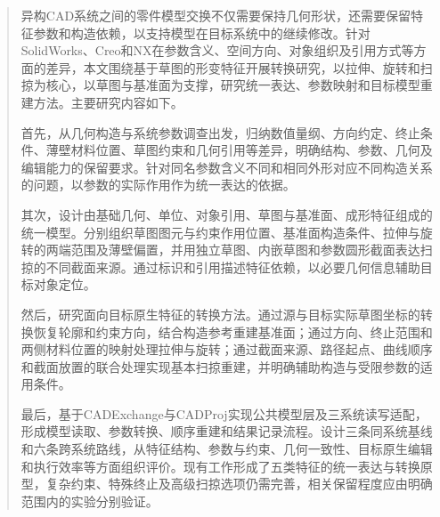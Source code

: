 \begin{abstract}
异构CAD系统之间的零件模型交换不仅需要保持几何形状，还需要保留特征参数和构造依赖，以支持模型在目标系统中的继续修改。针对SolidWorks、Creo和NX在参数含义、空间方向、对象组织及引用方式等方面的差异，本文围绕基于草图的形变特征开展转换研究，以拉伸、旋转和扫掠为核心，以草图与基准面为支撑，研究统一表达、参数映射和目标模型重建方法。主要研究内容如下。

首先，从几何构造与系统参数调查出发，归纳数值量纲、方向约定、终止条件、薄壁材料位置、草图约束和几何引用等差异，明确结构、参数、几何及编辑能力的保留要求。针对同名参数含义不同和相同外形对应不同构造关系的问题，以参数的实际作用作为统一表达的依据。

其次，设计由基础几何、单位、对象引用、草图与基准面、成形特征组成的统一模型。分别组织草图图元与约束作用位置、基准面构造条件、拉伸与旋转的两端范围及薄壁偏置，并用独立草图、内嵌草图和参数圆形截面表达扫掠的不同截面来源。通过标识和引用描述特征依赖，以必要几何信息辅助目标对象定位。

然后，研究面向目标原生特征的转换方法。通过源与目标实际草图坐标的转换恢复轮廓和约束方向，结合构造参考重建基准面；通过方向、终止范围和两侧材料位置的映射处理拉伸与旋转；通过截面来源、路径起点、曲线顺序和截面放置的联合处理实现基本扫掠重建，并明确辅助构造与受限参数的适用条件。

最后，基于CADExchange与CADProj实现公共模型层及三系统读写适配，形成模型读取、参数转换、顺序重建和结果记录流程。设计三条同系统基线和六条跨系统路线，从特征结构、参数与约束、几何一致性、目标原生编辑和执行效率等方面组织评价。现有工作形成了五类特征的统一表达与转换原型，复杂约束、特殊终止及高级扫掠选项仍需完善，相关保留程度应由明确范围内的实验分别验证。

\end{abstract}

